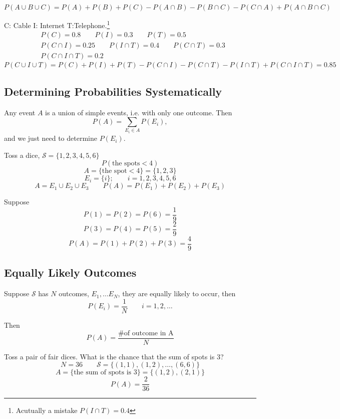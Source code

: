 \begin{prop}
\[ P(A \cup B \cup C)=P(A)+P(B)+P(C)-P(A \cap B)-P(B \cap C)-P(C \cap A)+P(A \cap B \cap C) \]
\end{prop}

\begin{exmp}
C: Cable \qquad I: Internet \qquad T:Telephone.\footnote{Acutually a mistake $P(I\cap T)=0.4$}
\begin{align*}
&P(C)=0.8 \qquad P(I)=0.3 \qquad P(T)=0.5	\\
&P(C\cap I)=0.25 \qquad P(I\cap T)=0.4 \qquad P(C\cap T)=0.3\\
&P(C\cap I \cap T)=0.2
\end{align*}
\[P(C\cup I \cup T)=P(C)+P(I)+P(T)-P(C \cap I)-P(C \cap T)-P(I \cap T)+P(C \cap I \cap T)=\boxed{0.85}\]
\end{exmp}

\subsection{Determining Probabilities Systematically}
Any event $A$ is a union of simple events, i.e. with only one outcome. Then
\[P(A)=\sum_{E_i \in A}P(E_i),\]
and we just need to determine $P(E_i)$.

\begin{exmp}
Toss a dice, $\mathcal{S}=\{1,2,3,4,5,6\}$
\[P(\text{the spots}<4)\]
\[A=\{\text{the spot}< 4 \}=\{1,2,3\}\]
\[E_i=\{i\};\qquad i=1,2,3,4,5,6\]
\[A=E_1 \cup E_2 \cup E_3 \qquad  P(A)=P(E_1)+P(E_2)+P(E_3)\]

Suppose 
\[P(1)=P(2)=P(6)=\frac{1}{9}\]
\[P(3)=P(4)=P(5)=\frac{2}{9}\]
\[P(A)=P(1)+P(2)+P(3)=\frac{4}{9}\]
\end{exmp}

\subsection{Equally Likely Outcomes}
Suppose $\mathcal{S}$ has $N$ outcomes, $E_1,\dots E_N$, they are equally likely to occur, then
\[P(E_i)=\frac{1}{N} \qquad i=1,2,\dots\]

Then 
\[P(A)=\frac{\text{\# of outcome in A}}{N}\]

\begin{exmp}
Toss a pair of fair dices. What is the chance that the sum of spots is 3?
\[N=36 \qquad \mathcal{S}=\{(1,1),(1,2),\dots ,(6,6)\}\]
\[A=\{\text{the sum of spots is 3}\}=\{(1,2),(2,1)\}\]
\[P(A)=\frac{2}{36}\]
\end{exmp}


